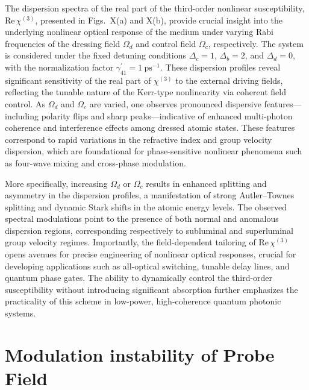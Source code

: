 \documentclass[12pt,a4paper]{article}
\begin{document}
The dispersion spectra of the real part of the third-order nonlinear susceptibility, \(\text{Re}\,\chi^{(3)}\), presented in Figs.~X(a) and X(b), provide crucial insight into the underlying nonlinear optical response of the medium under varying Rabi frequencies of the dressing field \(\Omega_d\) and control field \(\Omega_c\), respectively. The system is considered under the fixed detuning conditions \(\Delta_c = 1\), \(\Delta_b = 2\), and \(\Delta_d = 0\), with the normalization factor \(\gamma_{41}^\prime = 1~\text{ps}^{-1}\). These dispersion profiles reveal significant sensitivity of the real part of \(\chi^{(3)}\) to the external driving fields, reflecting the tunable nature of the Kerr-type nonlinearity via coherent field control. As \(\Omega_d\) and \(\Omega_c\) are varied, one observes pronounced dispersive features—including polarity flips and sharp peaks—indicative of enhanced multi-photon coherence and interference effects among dressed atomic states. These features correspond to rapid variations in the refractive index and group velocity dispersion, which are foundational for phase-sensitive nonlinear phenomena such as four-wave mixing and cross-phase modulation.

More specifically, increasing \(\Omega_d\) or \(\Omega_c\) results in enhanced splitting and asymmetry in the dispersion profiles, a manifestation of strong Autler--Townes splitting and dynamic Stark shifts in the atomic energy levels. The observed spectral modulations point to the presence of both normal and anomalous dispersion regions, corresponding respectively to subluminal and superluminal group velocity regimes. Importantly, the field-dependent tailoring of \(\text{Re}\,\chi^{(3)}\) opens avenues for precise engineering of nonlinear optical responses, crucial for developing applications such as all-optical switching, tunable delay lines, and quantum phase gates. The ability to dynamically control the third-order susceptibility without introducing significant absorption further emphasizes the practicality of this scheme in low-power, high-coherence quantum photonic systems.

\section{Modulation instability of Probe Field}
\end{document}
